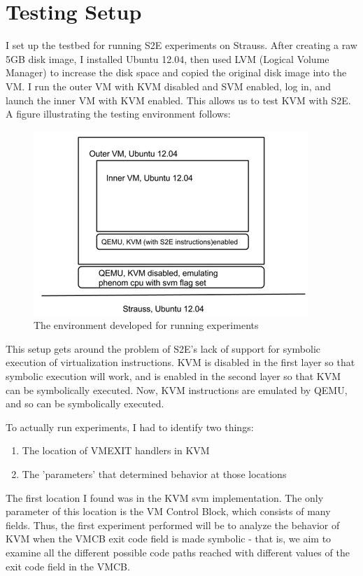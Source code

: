 \documentclass[11pt]{article}
\begin{document}
\section{Testing Setup}
I set up the testbed for running S2E experiments on Strauss. After creating a
raw 5GB disk image, I installed Ubuntu 12.04, then used LVM (Logical Volume
Manager) to increase the disk space and copied the original disk image into the
VM. I run the outer VM with KVM disabled and SVM enabled, log in, and launch the
inner VM with KVM enabled. This allows us to test KVM with S2E. A figure
illustrating the testing environment follows:
\begin{figure}[htp]
\centering
    \includegraphics[scale=.7]{test_setup}
\caption{The environment developed for running experiments}
\end{figure}
\newpage
This setup gets around the problem of S2E's lack of support for symbolic
execution of virtualization instructions. KVM is disabled in the first layer so
that symbolic execution will work, and is enabled in the second layer so that
KVM can be symbolically executed. Now, KVM instructions are emulated by QEMU,
and so can be symbolically executed. 
\par

To actually run experiments, I had to identify two things:
\begin{enumerate}
\item The location of VMEXIT handlers in KVM
\item The 'parameters' that determined behavior at those locations
\end{enumerate}

The first location I found was in the KVM svm implementation. The only parameter
of this location is the VM Control Block, which consists of many fields. Thus,
the first experiment performed will be to analyze the behavior of KVM when the
VMCB exit code field is made symbolic - that is, we aim to examine all the
different possible code paths reached with different values of the exit code
field in the VMCB. 
\end{document}
